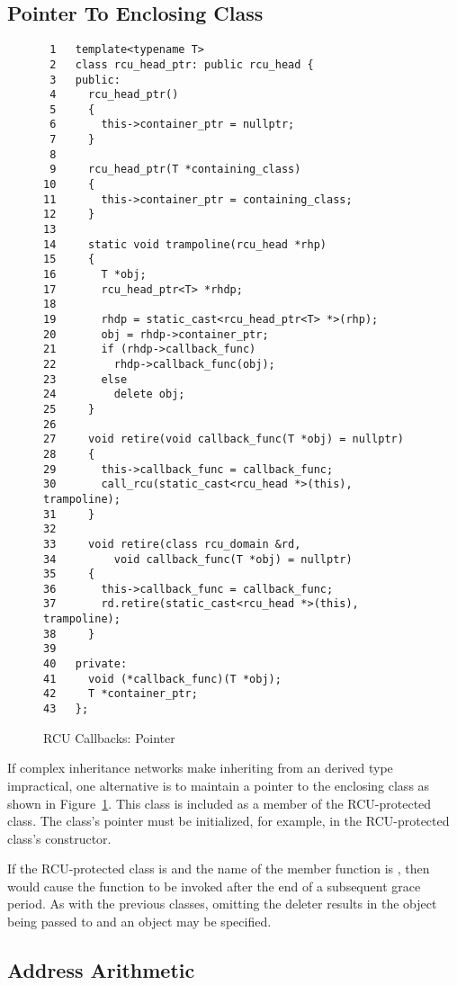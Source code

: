 \documentclass[letterpaper,10pt]{article}
\begin{document}
\subsection{Pointer To Enclosing Class}
\label{sec:Pointer To Enclosing Class}

\begin{figure}[tbp]
{ \scriptsize
\begin{verbatim}
 1   template<typename T>
 2   class rcu_head_ptr: public rcu_head {
 3   public:
 4     rcu_head_ptr()
 5     {
 6       this->container_ptr = nullptr;
 7     }
 8
 9     rcu_head_ptr(T *containing_class)
10     {
11       this->container_ptr = containing_class;
12     }
13
14     static void trampoline(rcu_head *rhp)
15     {
16       T *obj;
17       rcu_head_ptr<T> *rhdp;
18
19       rhdp = static_cast<rcu_head_ptr<T> *>(rhp);
20       obj = rhdp->container_ptr;
21       if (rhdp->callback_func)
22         rhdp->callback_func(obj);
23       else
24         delete obj;
25     }
26
27     void retire(void callback_func(T *obj) = nullptr)
28     {
29       this->callback_func = callback_func;
30       call_rcu(static_cast<rcu_head *>(this), trampoline);
31     }
32
33     void retire(class rcu_domain &rd,
34         void callback_func(T *obj) = nullptr)
35     {
36       this->callback_func = callback_func;
37       rd.retire(static_cast<rcu_head *>(this), trampoline);
38     }
39
40   private:
41     void (*callback_func)(T *obj);
42     T *container_ptr;
43   };
\end{verbatim}
}
\caption{RCU Callbacks: Pointer}
\label{fig:RCU Callbacks: Pointer}
\end{figure}

If complex inheritance networks make inheriting from an
 derived type impractical, one alternative is
to maintain a pointer to the enclosing class as shown in
Figure~\ref{fig:RCU Callbacks: Pointer}.
This  class is included as a member of the RCU-protected
class.
The  class's pointer must be initialized, for example,
in the RCU-protected class's constructor.

If the RCU-protected class is  and the name of the
 member function is , then
 would cause the function  to be
invoked after the end of a subsequent grace period.
As with the previous classes, omitting the deleter results
in the object being passed to  and an 
object may be specified.

\subsection{Address Arithmetic}
\label{sec:Address Arithmetic}
\end{document}
